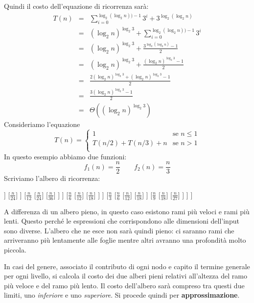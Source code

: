 Quindi il costo dell'equazione di ricorrenza sarà:
\begin{eqnarray*}
	T(n) &=& \sum_{i=0}^{\log_{2}(\log_{2}n))-1} 3^{i} + 3^{\log_{2}(\log_{2}n)} \\
	&=& (\log_{2}n)^{\log_{2}3}+\sum_{i=0}^{\log_{2}(\log_{2}n))-1} 3^{i}\\
	&=& (\log_{2}n)^{\log_{2}3} + \frac{3^{\log_{2}(\log_{2}n)}-1}{2}\\
	&=& (\log_{2}n)^{\log_{2}3} + \frac{(\log_{2}n)^{\log_{2}3}-1}{2}\\
	&=& \frac{2(\log_{2}n)^{\log_{2}3}+(\log_{2}n)^{\log_{2}3}-1}{2}\\
	&=& \frac{3(\log_{2}n)^{\log_{2}3}-1}{2}\\
	&=& \Theta((\log_{2}n)^{\log_{2}3})
\end{eqnarray*}
Consideriamo l'equazione
\begin{displaymath}
	T(n)=
	\begin{cases}
		1 & \mbox{se } n \leq 1\\
		T(n/2)+T(n/3)+n & \mbox{se } n> 1\\
	\end{cases}
\end{displaymath}
In questo esempio abbiamo due funzioni:
\begin{displaymath}
	f_{1}(n)=\frac{n}{2} \qquad f_{2}(n)=\frac{n}{3}
\end{displaymath}
Scriviamo l'albero di ricorrenza:
\begin{center}
\begin{forest}
[$n$
	[$\frac{n}{2}$
		[$\frac{n}{4}$
			[$\frac{n}{8}$
				[$\frac{n}{16}$
					[$\frac{n}{32}$]
					[$\frac{n}{48}$]
				]
				[$\frac{n}{24}$]
			]
			[$\frac{n}{12}$
				[$\frac{n}{24}$]
				[$\frac{n}{36}$]
			]
		]
		[$\frac{n}{6}$
			[$\frac{n}{12}$]
			[$\frac{n}{18}$]
		]
	]
	[$\frac{n}{3}$
		[$\frac{n}{6}$
			[$\frac{n}{12}$]
			[$\frac{n}{18}$]
		]
		[$\frac{n}{9}$
			[$\frac{n}{18}$]
			[$\frac{n}{27}$]
		]
	]
]
\end{forest}
\end{center}
A differenza di un albero pieno, in questo caso esistono rami più veloci e rami più lenti. Questo perché le espressioni che corrispondono alle dimensioni dell'input sono diverse. L'albero che ne esce non sarà quindi pieno: ci saranno rami che arriveranno più lentamente alle foglie mentre altri avranno una profondità molto piccola.

In casi del genere, associato il contributo di ogni nodo e capito il termine generale per ogni livello, si calcola il costo dei due alberi pieni relativi all'altezza del ramo più veloce e del ramo più lento. Il costo dell'albero sarà compreso tra questi due limiti, uno \textit{inferiore} e uno \textit{superiore}. Si procede quindi per \textbf{approssimazione}.

